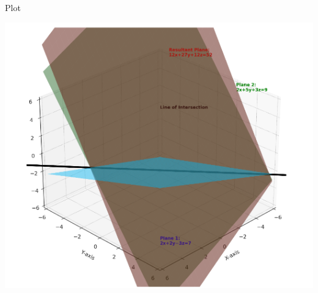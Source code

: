 \documentclass{beamer}
\begin{document}
\begin{frame}{Plot}
\begin{center}
\includegraphics[width=0.7\columnwidth]{figs/plot8.png}
\end{center}
\end{frame}
\end{document}
